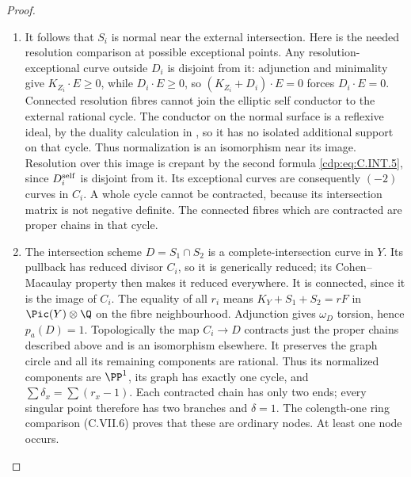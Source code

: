 \begin{proof}
\begin{enumerate}[label={$\langle1\rangle$\arabic*.},leftmargin=*]
\item It follows that $S_i$ is normal near the external
intersection. Here is the needed resolution
comparison at possible exceptional points. Any
resolution-exceptional curve outside $D_i$ is
disjoint from it: adjunction and minimality give
$K_{Z_i}\cdot E\ge0$, while $D_i\cdot E\ge0$,
so $(K_{Z_i}+D_i)\cdot E=0$ forces $D_i\cdot E=0$.
Connected resolution fibres cannot join the
elliptic self conductor to the external rational
cycle. The conductor on the normal surface is a
reflexive ideal, by the duality calculation in
, so it has no isolated additional support
on that cycle. Thus normalization is an isomorphism
near its image. Resolution over this image is
crepant by the second formula \eqref{cdp:eq:C.INT.5}, since
$D_i^{\rm self}$ is disjoint from it. Its
exceptional curves are consequently $(-2)$
curves in $C_i$. A whole cycle cannot be contracted,
because its intersection matrix is not negative
definite. The connected fibres which are
contracted are proper chains in that cycle.

\item The intersection scheme $D=S_1\cap S_2$ is a
complete-intersection curve in $Y$. Its pullback
has reduced divisor $C_i$, so it is generically
reduced; its Cohen--Macaulay property then makes
it reduced everywhere. It is connected, since it
is the image of $C_i$. The equality of all $r_i$
means $K_Y+S_1+S_2=rF$ in $\Pic(Y)\otimes\Q$
on the fibre neighbourhood. Adjunction gives
$\omega_D$ torsion, hence $p_a(D)=1$.
Topologically the map $C_i\to D$ contracts just
the proper chains described above and is an
isomorphism elsewhere. It preserves the graph
circle and all its remaining components are
rational. Thus its normalized components are
$\PP^1$, its graph has exactly one cycle, and
$\sum\delta_x=\sum(r_x-1)$. Each contracted
chain has only two ends; every singular point
therefore has two branches and $\delta=1$.
The colength-one ring comparison (C.VII.6)
proves that these are ordinary nodes. At least
one node occurs.


\end{enumerate}
\end{proof}
